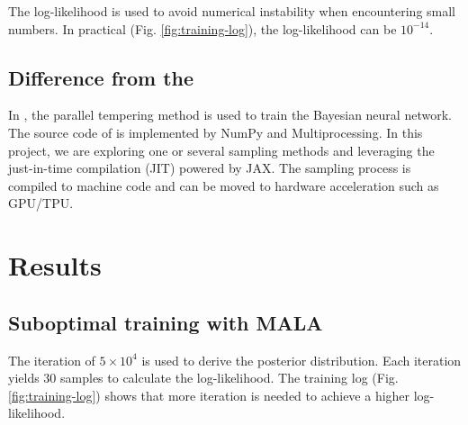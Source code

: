 \documentclass{article}
\begin{document}
The log-likelihood is used to avoid numerical instability when encountering small numbers. In practical (Fig. \ref{fig:training-log}), the log-likelihood can be $10^{-14}$. 

\subsection{Difference from the \citep{chandra2021bayesian}}

In \cite{chandra2021bayesian}, the parallel tempering method is used to train the Bayesian neural network. The source code of \citep{chandra2019langevin} is implemented by NumPy and Multiprocessing. In this project, we are exploring one or several sampling methods and leveraging the just-in-time compilation (JIT) powered by JAX\citep{jax2018github}. The sampling process is compiled to machine code and can be moved to hardware acceleration such as GPU/TPU.



\section{Results}

\subsection{Suboptimal training with MALA}

The iteration of $5\times 10^4$ is used to derive the posterior distribution. Each iteration yields $30$ samples to calculate the log-likelihood. The training log (Fig. \ref{fig:training-log}) shows that more iteration is needed to achieve a higher log-likelihood. 
\end{document}
